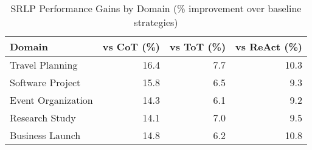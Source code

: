 \begin{table}[htbp]
\centering
\caption{SRLP Performance Gains by Domain (\% improvement over baseline strategies)}
\label{tab:domain_gains}
\begin{tabular}{lrrr}
\toprule
Domain & vs CoT (\%) & vs ToT (\%) & vs ReAct (\%) \\
\midrule
Travel Planning & 16.4 & 7.7 & 10.3 \\
Software Project & 15.8 & 6.5 & 9.3 \\
Event Organization & 14.3 & 6.1 & 9.2 \\
Research Study & 14.1 & 7.0 & 9.5 \\
Business Launch & 14.8 & 6.2 & 10.8 \\
\bottomrule
\end{tabular}
\end{table}
